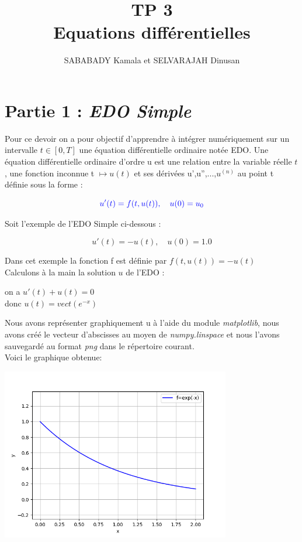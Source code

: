 \documentclass{article}
\title{TP 3 \\ Equations différentielles}
\author{SABABADY Kamala et SELVARAJAH Dinusan}
\begin{document}
\maketitle

\section{{\color{red}Partie 1 :} \textit{EDO Simple}}



Pour ce devoir on a pour objectif d'apprendre à intégrer numériquement sur un intervalle $t \in [0, T]$ une équation différentielle ordinaire notée EDO. Une équation différentielle ordinaire d’ordre u est une relation entre la variable réelle $t$ , une fonction inconnue t $\mapsto u(t)$ et ses dérivées u',u'',...,$u^{(n)}$ au point t définie sous la forme :

\begin{equation}
\label{edo_0}
\color {blue}u'(t) =  f(t, u(t)),\quad u(0) = u_0
\end{equation}

Soit l'exemple de l'EDO Simple ci-dessous :

\begin{equation}
\label{exemple_1}
u'(t) =  -u(t), \quad u(0)  =  1.0
\end{equation}

Dans cet exemple la fonction f est définie par $f(t, u(t))= -u(t)$ \\

Calculons à la main la solution $u$ de l'EDO :
\begin{center}
		on a $u'(t)+u(t)=0$ \\
 	 	donc $u(t)= vect({e^{-x}}) $ \\
\end{center}

 Nous avons représenter graphiquement u à l'aide du module \textit{matplotlib}, nous avons créé le vecteur d'abscisses au moyen de \textit{numpy.linspace} et nous l'avons sauvegardé au format \textit{png} dans le répertoire courant.\\
Voici le graphique obtenue:

\includegraphics[width=10cm]{1.png}
\end{document}
